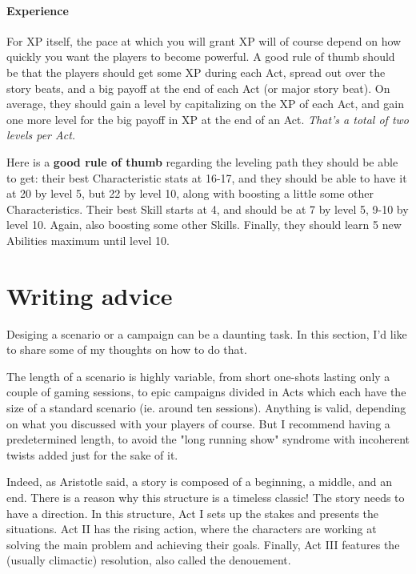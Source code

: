 \paragraph{Experience}

For XP itself, the pace at which you will grant XP will of course depend on how quickly you want the players to become powerful. A good rule of thumb should be that the players should get some XP during each Act, spread out over the story beats, and a big payoff at the end of each Act (or major story beat). On average, they should gain a level by capitalizing on the XP of each Act, and gain one more level for the big payoff in XP at the end of an Act. \textit{That's a total of two levels per Act.}

Here is a \textbf{good rule of thumb} regarding the leveling path they should be able to get: their best Characteristic stats at 16-17, and they should be able to have it at 20 by level 5, but 22 by level 10, along with boosting a little some other Characteristics. Their best Skill starts at 4, and should be at 7 by level 5, 9-10 by level 10. Again, also boosting some other Skills. Finally, they should learn 5 new Abilities maximum until level 10.



\section{Writing advice}

Desiging a scenario or a campaign can be a daunting task. In this section, I'd like to share some of my thoughts on how to do that.

The length of a scenario is highly variable, from short one-shots lasting only a couple of gaming sessions, to epic campaigns divided in Acts which each have the size of a standard scenario (ie. around ten sessions). Anything is valid, depending on what you discussed with your players of course. But I recommend having a predetermined length, to avoid the "long running show" syndrome with incoherent twists added just for the sake of it.

Indeed, as Aristotle said, a story is composed of a beginning, a middle, and an end. There is a reason why this structure is a timeless classic! The story needs to have a direction. In this structure, Act I sets up the stakes and presents the situations. Act II has the rising action, where the characters are working at solving the main problem and achieving their goals. Finally, Act III features the (usually climactic) resolution, also called the denouement. 

